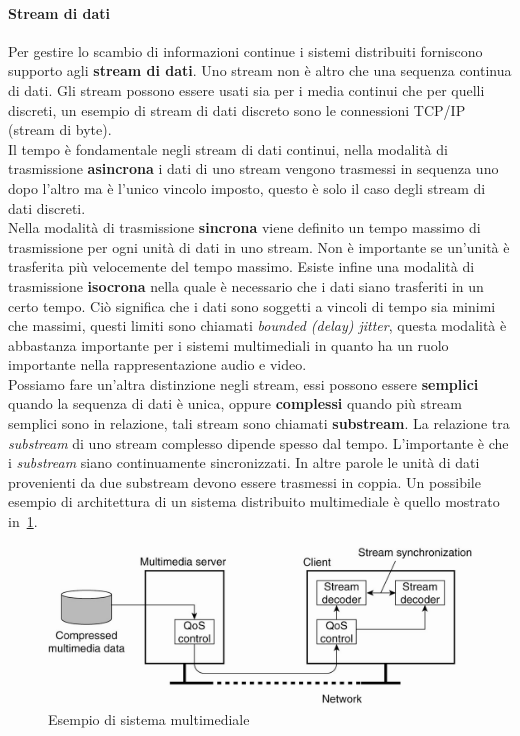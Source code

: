 \paragraph{Stream di dati}
Per gestire lo scambio di informazioni continue i sistemi distribuiti forniscono supporto agli \textbf{stream di dati}. Uno stream non è altro che una sequenza continua di dati. Gli stream possono essere usati sia per i media continui che per quelli discreti, un esempio di stream di dati discreto sono le connessioni TCP/IP (stream di byte).\\
Il tempo è fondamentale negli stream di dati continui, nella modalità di trasmissione \textbf{asincrona} i dati di uno stream vengono trasmessi in sequenza uno dopo l'altro ma è l'unico vincolo imposto, questo è solo il caso degli stream di dati discreti. \\
Nella modalità di trasmissione \textbf{sincrona} viene definito un tempo massimo di trasmissione per ogni unità di dati in uno stream. Non è importante se un'unità è trasferita più velocemente del tempo massimo.
Esiste infine una modalità di trasmissione \textbf{isocrona} nella quale è necessario che i dati siano trasferiti in un certo tempo. Ciò significa che i dati sono soggetti a vincoli di tempo sia minimi che massimi, questi limiti sono chiamati \emph{bounded (delay) jitter}, questa modalità è abbastanza importante per i sistemi multimediali in quanto ha un ruolo importante nella rappresentazione audio e video.\\
Possiamo fare un'altra distinzione negli stream, essi possono essere \textbf{semplici} quando la sequenza di dati è unica, oppure \textbf{complessi} quando più stream semplici sono in relazione, tali stream sono chiamati \textbf{substream}. La relazione tra \emph{substream} di uno stream complesso dipende spesso dal tempo. L'importante è che i \emph{substream} siano continuamente sincronizzati. In altre parole le unità di dati provenienti da due substream devono essere trasmessi in coppia. Un possibile esempio di architettura di un sistema distribuito multimediale è quello mostrato in \figurename\,\ref{img:stream}.
\begin{figure}
\centering
\includegraphics[scale=0.4]{img/stream.png}
\caption{Esempio di sistema multimediale}\label{img:stream}
\end{figure}
